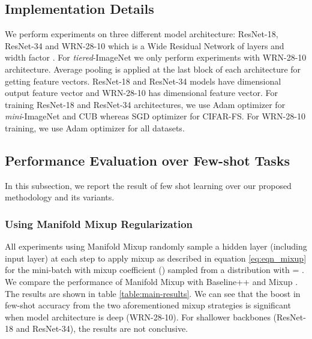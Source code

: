 \documentclass[10pt,twocolumn,letterpaper]{article}
\begin{document}
\subsection{Implementation Details}
We perform experiments on three different model architecture: ResNet-18, ResNet-34 \cite{resnet2015He} and WRN-28-10 \cite{wrn2016Zagoruyko} which is a Wide Residual Network of  layers and width factor . For \textit{tiered}-ImageNet we only perform experiments with WRN-28-10 architecture. Average pooling is applied at the last block of each architecture for getting feature vectors. ResNet-18 and ResNet-34 models have  dimensional output feature vector and WRN-28-10 has  dimensional feature vector. For training ResNet-18 and ResNet-34 architectures, we use Adam \cite{kingma2014adam} optimizer for \textit{mini}-ImageNet and CUB whereas SGD optimizer for CIFAR-FS. For WRN-28-10 training, we use Adam optimizer for all datasets.

\begin{figure*}[t]
\centering
{}
    \label{2-dplot}
\end{figure*}


\vspace{-3pt}
\subsection{Performance Evaluation over Few-shot Tasks}
\vspace{-5pt}
In this subsection, we report the result of few shot learning over our proposed methodology and its variants.
\vspace{-4pt}
\subsubsection{Using Manifold Mixup Regularization}
\vspace{-4pt}
All experiments using Manifold Mixup \cite{verma2019manifold} randomly sample a hidden layer (including input layer) at each step to apply mixup as described in equation \ref{eq:eqn_mixup} for the mini-batch with mixup coefficient () sampled from a  distribution with  = .
We compare the performance of Manifold Mixup \cite{verma2019manifold} with Baseline++ \cite{chen2019closerfewshot} and Mixup \cite{zhang2018mixup}. The results are shown in table \ref{table:main-results}. We can see that the boost in few-shot accuracy from the two aforementioned mixup strategies is significant when model architecture is deep (WRN-28-10). For shallower backbones (ResNet-18 and ResNet-34), the results are not conclusive.
\end{document}
